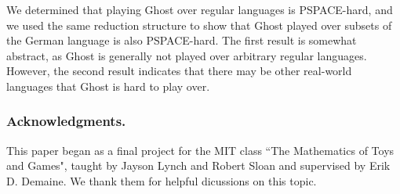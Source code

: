 \documentclass[runningheads,a4paper]{llncs}
\begin{document}
We determined that playing Ghost over regular languages is PSPACE-hard, and we used the same reduction structure to show that Ghost played over subsets of the German language is also PSPACE-hard. The first result is somewhat abstract, as Ghost is generally not played over arbitrary regular languages. However, the second result indicates that there may be other real-world languages that Ghost is hard to play over.

\subsubsection*{Acknowledgments.} This paper began as a final project for the MIT class ``The Mathematics of Toys and Games", taught by Jayson Lynch and Robert Sloan and supervised by Erik D. Demaine. We thank them for helpful dicussions on this topic.




%
%
%
%
%
%
%
%
\end{document}

